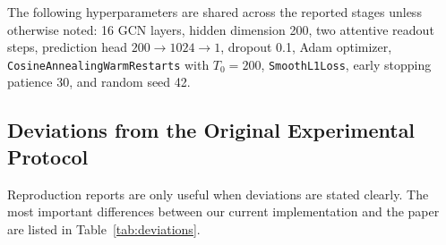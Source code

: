 The following hyperparameters are shared across the reported stages unless otherwise noted: 16 GCN layers, hidden dimension 200, two attentive readout steps, prediction head \(200 \rightarrow 1024 \rightarrow 1\), dropout 0.1, Adam optimizer, \texttt{CosineAnnealingWarmRestarts} with \(T_0 = 200\), \texttt{SmoothL1Loss}, early stopping patience 30, and random seed 42.

\subsection{Deviations from the Original Experimental Protocol}

Reproduction reports are only useful when deviations are stated clearly. The most important differences between our current implementation and the paper are listed in Table~\ref{tab:deviations}.

